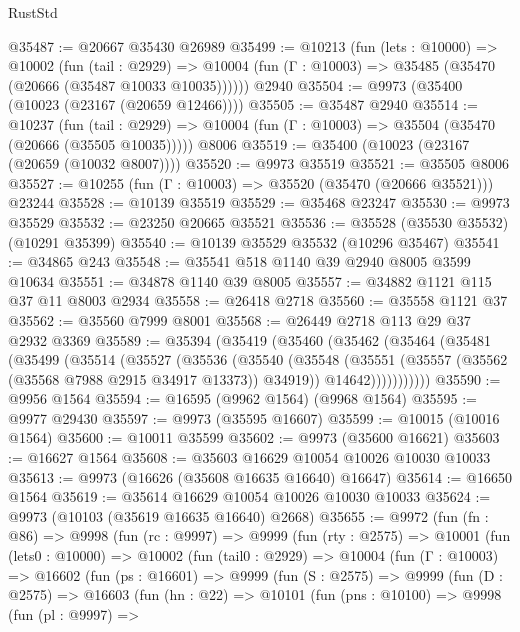 \begin{lexlean}{RustStd}
\begin{coremodule}
@35487 := @20667 @35430 @26989
@35499 := @10213
    (fun (lets : @10000) =>
    @10002
      (fun (tail : @2929) =>
      @10004 (fun (Γ : @10003) => @35485 (@35470 (@20666 (@35487 @10033 @10035))))))
    @2940
@35504 := @9973 (@35400 (@10023 (@23167 (@20659 @12466))))
@35505 := @35487 @2940
@35514 := @10237
    (fun (tail : @2929) => @10004 (fun (Γ : @10003) => @35504 (@35470 (@20666 (@35505 @10035)))))
    @8006
@35519 := @35400 (@10023 (@23167 (@20659 (@10032 @8007))))
@35520 := @9973 @35519
@35521 := @35505 @8006
@35527 := @10255 (fun (Γ : @10003) => @35520 (@35470 (@20666 @35521))) @23244
@35528 := @10139 @35519
@35529 := @35468 @23247
@35530 := @9973 @35529
@35532 := @23250 @20665 @35521
@35536 := @35528 (@35530 @35532) (@10291 @35399)
@35540 := @10139 @35529 @35532 (@10296 @35467)
@35541 := @34865 @243
@35548 := @35541 @518 @1140 @39 @2940 @8005 @3599 @10634
@35551 := @34878 @1140 @39 @8005
@35557 := @34882 @1121 @115 @37 @11 @8003 @2934
@35558 := @26418 @2718
@35560 := @35558 @1121 @37
@35562 := @35560 @7999 @8001
@35568 := @26449 @2718 @113 @29 @37 @2932 @3369
@35589 := @35394
    (@35419
      (@35460
        (@35462
          (@35464
            (@35481
              (@35499
                (@35514
                  (@35527
                    (@35536
                      (@35540
                        (@35548
                          (@35551 (@35557 (@35562 (@35568 @7988 @2915 @34917 @13373)) @34919))
                          @14642)))))))))))
@35590 := @9956 @1564
@35594 := @16595 (@9962 @1564) (@9968 @1564)
@35595 := @9977 @29430
@35597 := @9973 (@35595 @16607)
@35599 := @10015 (@10016 @1564)
@35600 := @10011 @35599
@35602 := @9973 (@35600 @16621)
@35603 := @16627 @1564
@35608 := @35603 @16629 @10054 @10026 @10030 @10033
@35613 := @9973 (@16626 (@35608 @16635 @16640) @16647)
@35614 := @16650 @1564
@35619 := @35614 @16629 @10054 @10026 @10030 @10033
@35624 := @9973 (@10103 (@35619 @16635 @16640) @2668)
@35655 := @9972
    (fun (fn : @86) =>
    @9998
      (fun (rc : @9997) =>
      @9999
        (fun (rty : @2575) =>
        @10001
          (fun (lets0 : @10000) =>
          @10002
            (fun (tail0 : @2929) =>
            @10004
              (fun (Γ : @10003) =>
              @16602
                (fun (ps : @16601) =>
                @9999
                  (fun (S : @2575) =>
                  @9999
                    (fun (D : @2575) =>
                    @16603
                      (fun (hn : @22) =>
                      @10101
                        (fun (pns : @10100) =>
                        @9998
                          (fun (pl : @9997) =>

\end{coremodule}
\end{lexlean}
